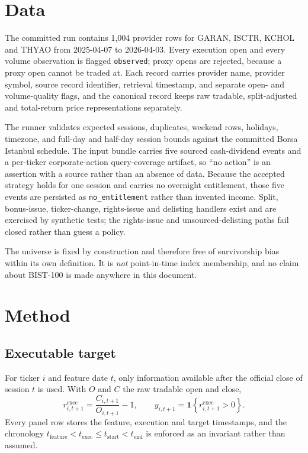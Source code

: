 \documentclass{article}
\theoremstyle{plain}
\theoremstyle{remark}
\begin{document}
\section{Data}

The committed run contains 1{,}004 provider rows for GARAN, ISCTR, KCHOL and
THYAO from 2025-04-07 to 2026-04-03. Every execution open and every volume
observation is flagged \texttt{observed}; proxy opens are rejected, because a
proxy open cannot be traded at. Each record carries provider name, provider
symbol, source record identifier, retrieval timestamp, and separate open- and
volume-quality flags, and the canonical record keeps raw tradable, split-adjusted
and total-return price representations separately.

The runner validates expected sessions, duplicates, weekend rows, holidays,
timezone, and full-day and half-day session bounds against the committed Borsa
Istanbul schedule. The input bundle carries five sourced cash-dividend events
and a per-ticker corporate-action query-coverage artifact, so ``no action'' is an
assertion with a source rather than an absence of data. Because the accepted
strategy holds for one session and carries no overnight entitlement, those five
events are persisted as \texttt{no\_entitlement} rather than invented income.
Split, bonus-issue, ticker-change, rights-issue and delisting handlers exist and
are exercised by synthetic tests; the rights-issue and unsourced-delisting paths
fail closed rather than guess a policy.

The universe is fixed by construction and therefore free of survivorship bias
within its own definition. It is \emph{not} point-in-time index membership, and
no claim about BIST-100 is made anywhere in this document.

\section{Method}

\subsection{Executable target}

For ticker $i$ and feature date $t$, only information available after the
official close of session $t$ is used. With $O$ and $C$ the raw tradable open and
close,
\begin{equation}
r_{i,t+1}^{\mathrm{exec}} = \frac{C_{i,t+1}}{O_{i,t+1}} - 1,
\qquad
y_{i,t+1} = \mathbf{1}\!\left\{ r_{i,t+1}^{\mathrm{exec}} > 0 \right\}.
\end{equation}
Every panel row stores the feature, execution and target timestamps, and the
chronology $t_{\mathrm{feature}} < t_{\mathrm{exec}} \le t_{\mathrm{start}} <
t_{\mathrm{end}}$ is enforced as an invariant rather than assumed.
\end{document}

